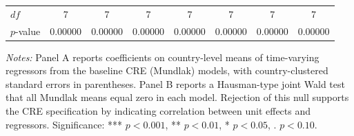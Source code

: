 \begin{table}[!htbp]
\begin{tabular}{lccccccc}
$df$ & 7 & 7 & 7 & 7 & 7 & 7 & 7 \\
$p$-value & 0.00000 & 0.00000 & 0.00000 & 0.00000 & 0.00000 & 0.00000 & 0.00000 \\
\hline
\end{tabular}
\vspace{0.4em}
\begin{minipage}{0.96\linewidth}
\footnotesize
\textit{Notes:} Panel A reports coefficients on country-level means of time-varying regressors from the baseline CRE (Mundlak) models, with country-clustered standard errors in parentheses. Panel B reports a Hausman-type joint Wald test that all Mundlak means equal zero in each model. Rejection of this null supports the CRE specification by indicating correlation between unit effects and regressors. Significance: *** $p<0.001$, ** $p<0.01$, * $p<0.05$, . $p<0.10$.
\end{minipage}
\end{table}
